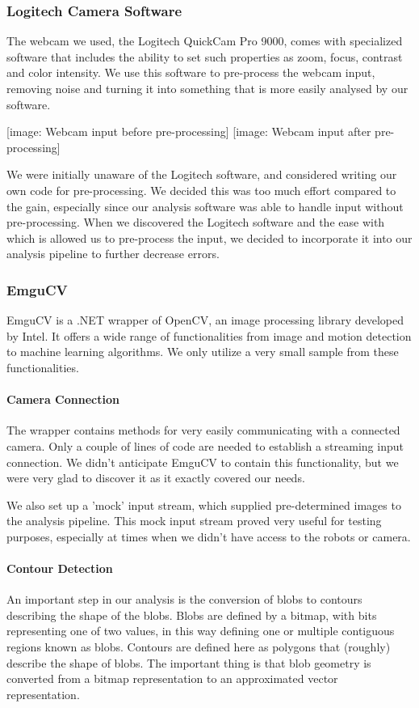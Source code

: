 \documentclass[10pt,twocolumn]{scrartcl}
\begin{document}
\subsubsection{Logitech Camera Software}
The webcam we used, the Logitech QuickCam Pro 9000, comes with specialized software that includes the ability to set such properties as zoom, focus, contrast and color intensity. We use this software to pre-process the webcam input, removing noise and turning it into something that is more easily analysed by our software.

[image: Webcam input before pre-processing] [image: Webcam input after pre-processing]

We were initially unaware of the Logitech software, and considered writing our own code for pre-processing. We decided this was too much effort compared to the gain, especially since our analysis software was able to handle input without pre-processing. When we discovered the Logitech software and the ease with which is allowed us to pre-process the input, we decided to incorporate it into our analysis pipeline to further decrease errors.

\subsubsection{EmguCV}
EmguCV is a .NET wrapper of OpenCV, an image processing library developed by Intel. It offers a wide range of functionalities from image and motion detection to machine learning algorithms. We only utilize a very small sample from these functionalities.

\paragraph{Camera Connection}
The wrapper contains methods for very easily communicating with a connected camera. Only a couple of lines of code are needed to establish a streaming input connection. We didn't anticipate EmguCV to contain this functionality, but we were very glad to discover it as it exactly covered our needs.

We also set up a 'mock' input stream, which supplied pre-determined images to the analysis pipeline. This mock input stream proved very useful for testing purposes, especially at times when we didn't have access to the robots or camera.

\paragraph{Contour Detection}
An important step in our analysis is the conversion of blobs to contours describing the shape of the blobs. Blobs are defined by a bitmap, with bits representing one of two values, in this way defining one or multiple contiguous regions known as blobs. Contours are defined here as polygons that (roughly) describe the shape of blobs. The important thing is that blob geometry is converted from a bitmap representation to an approximated vector representation.
\end{document}
